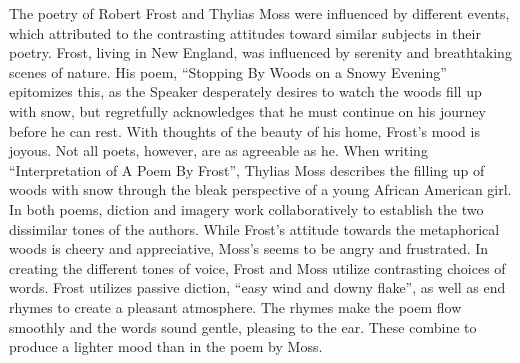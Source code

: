 \documentclass[12pt]{book}
\renewcommand{\indent}{\hspace{1cm}}
\begin{document}
\begin{spacing}{2}
\begin{linenumbers*}
\modulolinenumbers[5]
\indent The poetry of Robert Frost and Thylias Moss were influenced by different events, which attributed to the contrasting attitudes toward similar subjects in their poetry.  Frost, living in New England, was influenced by serenity and breathtaking scenes of nature. His poem, “Stopping By Woods on a Snowy Evening” epitomizes this, as the Speaker desperately desires to watch the woods fill up with snow, but regretfully acknowledges that he must continue on his journey before he can rest. With thoughts of the beauty of his home, Frost's mood is joyous. Not all poets, however, are as agreeable as he. When writing “Interpretation of A Poem By Frost”, Thylias Moss describes the filling up of woods with snow through the bleak perspective of a young African American girl. In both poems, diction and imagery work collaboratively to establish the two dissimilar tones of the authors. While Frost's attitude towards the metaphorical woods is cheery and appreciative, Moss's seems to be angry and frustrated. In creating the different tones of voice, Frost and Moss utilize contrasting choices of words. Frost utilizes passive diction, “easy wind and downy flake”, as well as end rhymes to create a pleasant atmosphere. The rhymes make the poem flow smoothly and the words sound gentle, pleasing to the ear. These combine to produce a lighter mood than in the poem by Moss. 


\end{linenumbers*}
\end{spacing}
\end{document}
